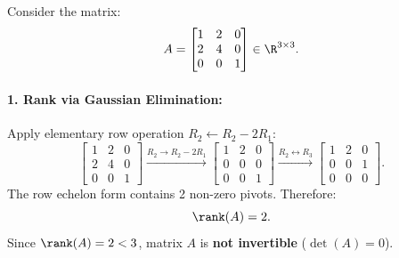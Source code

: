 \begin{example}
Consider the matrix:
\begin{equation}
    A = \begin{bmatrix} 1 & 2 & 0 \\ 2 & 4 & 0 \\ 0 & 0 & 1 \end{bmatrix} \in \R^{3 \times 3}.
\end{equation}

\paragraph{1. Rank via Gaussian Elimination:}
Apply elementary row operation $R_2 \leftarrow R_2 - 2R_1$:
\begin{equation}
    \begin{bmatrix} 1 & 2 & 0 \\ 2 & 4 & 0 \\ 0 & 0 & 1 \end{bmatrix}
    \xrightarrow{R_2 \to R_2 - 2R_1}
    \begin{bmatrix} 1 & 2 & 0 \\ 0 & 0 & 0 \\ 0 & 0 & 1 \end{bmatrix}
    \xrightarrow{R_2 \leftrightarrow R_3}
    \begin{bmatrix} 1 & 2 & 0 \\ 0 & 0 & 1 \\ 0 & 0 & 0 \end{bmatrix}.
\end{equation}
The row echelon form contains 2 non-zero pivots. Therefore:
\begin{equation}
    \rank(A) = 2.
\end{equation}
Since $\rank(A) = 2 < 3$, matrix $A$ is \textbf{not invertible} ($\det(A) = 0$).


\end{example}
